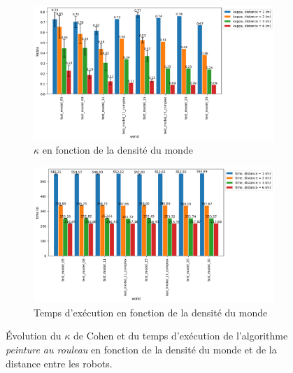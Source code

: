 \documentclass[english,RandD]{rapportPFE}  %
\begin{document}
			\begin{figure}[h!]
				\centering
				\begin{subfigure}[t]{0.9\linewidth}
					\includegraphics[width=\linewidth]{graphics/peinture_au_rouleau-kappa_vs_world_for_each_d.png}
					\caption{$\kappa$ en fonction de la densité du monde}
					\label{fig:peinture_au_rouleau-kappa_vs_world}
				\end{subfigure}
				\hfill
				\begin{subfigure}[t]{0.9\linewidth}
						\includegraphics[width=\linewidth]{graphics/peinture_au_rouleau-time_vs_world_for_each_d.png}
						\caption{Temps d'exécution en fonction de la densité du monde}
						\label{fig:peinture_au_rouleau-time_vs_world}
				\end{subfigure}
				\caption{Évolution du $\kappa$ de Cohen et du temps d'exécution de l'algorithme \textit{peinture au rouleau} en fonction de la densité du monde et de la distance entre les robots.}
				\label{fig:peinture_au_rouleau-world}
			\end{figure}
\end{document}
